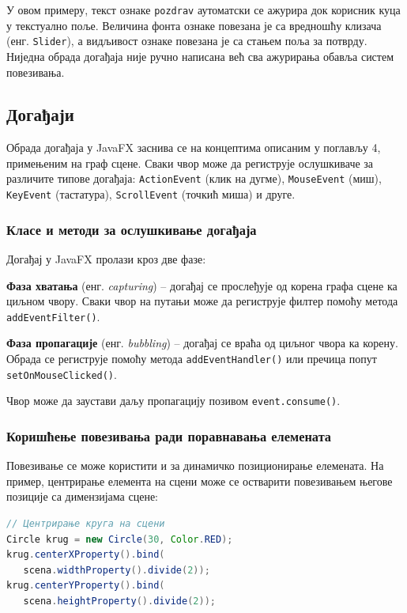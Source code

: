 У овом примеру, текст ознаке \texttt{pozdrav} аутоматски се ажурира док корисник куца у текстуално поље. Величина фонта ознаке повезана је са вредношћу клизача (енг. \texttt{Slider}), а видљивост ознаке повезана је са стањем поља за потврду. Ниједна обрада догађаја није ручно написана већ сва ажурирања обавља систем повезивања.


\subsection{Догађаји}

Обрада догађаја у JavaFX заснива се на концептима описаним у поглављу 4, примењеним на граф сцене. Сваки чвор може да региструје ослушкиваче за различите типове догађаја: \texttt{ActionEvent} (клик на дугме), \texttt{MouseEvent} (миш), \texttt{KeyEvent} (тастатура), \texttt{ScrollEvent} (точкић миша) и друге.

\subsubsection{Класе и методи за ослушкивање догађаја}

Догађај у JavaFX пролази кроз две фазе:

\textbf{Фаза хватања} (енг. \textit{capturing}) – догађај се прослеђује од корена графа сцене ка циљном чвору. Сваки чвор на путањи може да региструје филтер помоћу метода \texttt{addEventFilter()}.

\textbf{Фаза пропагације} (енг. \textit{bubbling}) – догађај се враћа од циљног чвора ка корену. Обрада се региструје помоћу метода \texttt{addEventHandler()} или пречица попут \texttt{setOnMouseClicked()}.

Чвор може да заустави даљу пропагацију позивом \texttt{event.consume()}.

\subsubsection{Коришћење повезивања ради поравнавања елемената}

Повезивање се може користити и за динамичко позиционирање елемената. На пример, центрирање елемента на сцени може се остварити повезивањем његове позиције са димензијама сцене:


\begin{lstlisting}[language=Java]
// Центрирање круга на сцени
Circle krug = new Circle(30, Color.RED);
krug.centerXProperty().bind(
   scena.widthProperty().divide(2));
krug.centerYProperty().bind(
   scena.heightProperty().divide(2));
\end{lstlisting}


